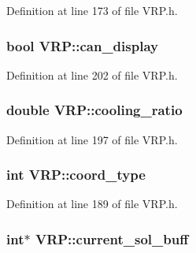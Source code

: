 Definition at line 173 of file VRP.h.

\hypertarget{class_v_r_p_a22da6861faa4543f73b7a66d89a92f91}{
\subsubsection[{can\_\-display}]{\setlength{\rightskip}{0pt plus 5cm}bool {\bf VRP::can\_\-display}}}
\label{class_v_r_p_a22da6861faa4543f73b7a66d89a92f91}


Definition at line 202 of file VRP.h.

\hypertarget{class_v_r_p_a68589860bea9d0a278ab57bbefb3f8a0}{
\subsubsection[{cooling\_\-ratio}]{\setlength{\rightskip}{0pt plus 5cm}double {\bf VRP::cooling\_\-ratio}}}
\label{class_v_r_p_a68589860bea9d0a278ab57bbefb3f8a0}


Definition at line 197 of file VRP.h.

\hypertarget{class_v_r_p_aa20a5dbd3e3070a63a72a76c2ff46722}{
\subsubsection[{coord\_\-type}]{\setlength{\rightskip}{0pt plus 5cm}int {\bf VRP::coord\_\-type}}}
\label{class_v_r_p_aa20a5dbd3e3070a63a72a76c2ff46722}


Definition at line 189 of file VRP.h.

\hypertarget{class_v_r_p_a8117433ec924a862c615d1a4c5f89b4a}{
\subsubsection[{current\_\-sol\_\-buff}]{\setlength{\rightskip}{0pt plus 5cm}int$\ast$ {\bf VRP::current\_\-sol\_\-buff}}}
\label{class_v_r_p_a8117433ec924a862c615d1a4c5f89b4a}


